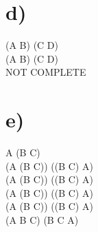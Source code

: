 \documentclass{article}
\begin{document}
\section*{d)}
(A \wedge B) \vee (C \Rightarrow D)\\
(A \wedge B) \vee (\neg C \vee D)\\
NOT \: COMPLETE

\section*{e)}
A \Leftrightarrow (B \Rightarrow \neg C)\\
(A \Rightarrow (B \Rightarrow \neg C)) \wedge ((B \Rightarrow \neg C) \Rightarrow A)\\
(\neg A \vee (B \Rightarrow \neg C)) \wedge (\neg (B \Rightarrow \neg C) \vee A)\\
(\neg A \vee (\neg B \vee \neg C)) \wedge (\neg (\neg B \vee \neg C) \vee A)\\
(\neg A \vee (\neg B \vee \neg C)) \wedge ((B \vee C) \vee A)\\
(\neg A \vee \neg B \vee \neg C) \wedge (B \vee C \vee A)
\end{document}
